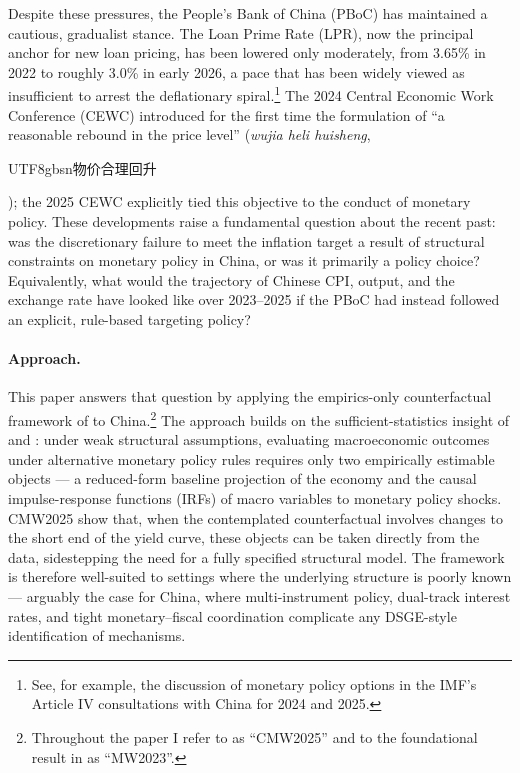 \documentclass[12pt, a4paper]{article}
\begin{document}
Despite these pressures, the People's Bank of China (PBoC) has maintained a cautious, gradualist stance. The Loan Prime Rate (LPR), now the principal anchor for new loan pricing, has been lowered only moderately, from 3.65\% in 2022 to roughly 3.0\% in early 2026, a pace that has been widely viewed as insufficient to arrest the deflationary spiral.\footnote{See, for example, the discussion of monetary policy options in the IMF's Article IV consultations with China for 2024 and 2025.} The 2024 Central Economic Work Conference (CEWC) introduced for the first time the formulation of ``a reasonable rebound in the price level'' (\textit{wujia heli huisheng}, \begin{CJK}{UTF8}{gbsn}物价合理回升\end{CJK}); the 2025 CEWC explicitly tied this objective to the conduct of monetary policy. These developments raise a fundamental question about the recent past: was the discretionary failure to meet the inflation target a result of structural constraints on monetary policy in China, or was it primarily a policy choice? Equivalently, what would the trajectory of Chinese CPI, output, and the exchange rate have looked like over 2023--2025 if the PBoC had instead followed an explicit, rule-based targeting policy?

\paragraph{Approach.} This paper answers that question by applying the empirics-only counterfactual framework of \citet{wolf2025} to China.\footnote{Throughout the paper I refer to \citet{wolf2025} as ``CMW2025'' and to the foundational result in \citet{mckay2023} as ``MW2023''.} The approach builds on the sufficient-statistics insight of \citet{mckay2023} and \citet{barnichon2023}: under weak structural assumptions, evaluating macroeconomic outcomes under alternative monetary policy rules requires only two empirically estimable objects --- a reduced-form baseline projection of the economy and the causal impulse-response functions (IRFs) of macro variables to monetary policy shocks. CMW2025 show that, when the contemplated counterfactual involves changes to the short end of the yield curve, these objects can be taken directly from the data, sidestepping the need for a fully specified structural model. The framework is therefore well-suited to settings where the underlying structure is poorly known --- arguably the case for China, where multi-instrument policy, dual-track interest rates, and tight monetary--fiscal coordination complicate any DSGE-style identification of mechanisms.
\end{document}
